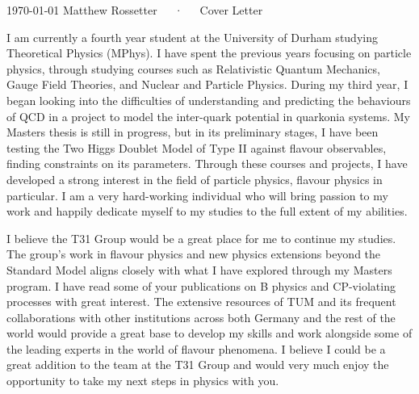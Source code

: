 \documentclass[11pt, a4paper]{awesome-cv}
\newcommand\research{T31 Group  }
\newcommand\country{Germany }
\newcommand\uni{TUM }
\begin{document}
\makecvheader[R]

\makecvfooter
  {\today}
  {Matthew Rossetter~~~·~~~Cover Letter}
  {}

\makelettertitle

\begin{cvletter}

I am currently a fourth year student at the University of Durham studying Theoretical Physics (MPhys). 
I have spent the previous years focusing on particle physics, through studying courses such as Relativistic Quantum Mechanics, Gauge Field Theories, and Nuclear and Particle Physics. 
During my third year, I began looking into the difficulties of understanding and predicting the behaviours of QCD in a project to model the inter-quark potential in quarkonia systems.
My Masters thesis is still in progress, but in its preliminary stages, I have been testing the Two Higgs Doublet Model of Type II against flavour observables, finding constraints on its parameters. 
Through these courses and projects, I have developed a strong interest in the field of particle physics, flavour physics in particular. 
I am a very hard-working individual who will bring passion to my work and happily dedicate myself to my studies to the full extent of my abilities. 


\lettersection{Why the \research?}
I believe the \research would be a great place for me to continue my studies.
The group's work in flavour physics and new physics extensions beyond the Standard Model aligns closely with what I have explored through my Masters program. 
I have read some of your publications on B physics and CP-violating processes with great interest.
The extensive resources of \uni and its frequent collaborations with other institutions across both \country and the rest of the world would provide a great base to develop my skills and work alongside some of the leading experts in the world of flavour phenomena. 
I believe I could be a great addition to the team at the \research and would very much enjoy the opportunity to take my next steps in physics with you. 


\end{cvletter}
\end{document}
